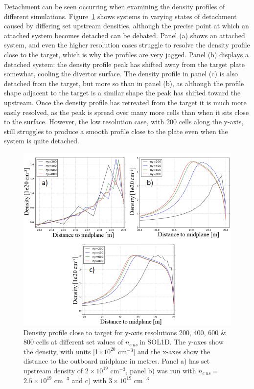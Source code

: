 \documentclass[12pt]{article}  %
\providecommand{\e}[1]{\ensuremath{\times 10^{#1}}} %
\providecommand{\noNe}[1]{{${#1}\times 10^{19}$ cm$^{-3}$}} %
\providecommand{\pow}[1]{{$^{#1}$}} %
\providecommand{\neus}{$n_{e~us}~$} %
\begin{document}
Detachment can be seen occurring when examining the density profiles of different simulations. Figure~\ref{figneprofneusALLtriang} shows systems in varying states of detachment caused by differing set upstream densities, although the precise point at which an attached system becomes detached can be debated. Panel (a) shows an attached system, and even the higher resolution cases struggle to resolve the density profile close to the target, which is why the profiles are very jagged. Panel (b) displays a detached system: the density profile peak has shifted away from the target plate somewhat, cooling the divertor surface. The density profile in panel (c) is also detached from the target, but more so than in panel (b), as although the profile shape adjacent to the target is a similar shape the peak has shifted toward the upstream. Once the density profile has retreated from the target it is much more easily resolved, as the peak is spread over many more cells than when it sits close to the surface. However, the low resolution case, with 200 cells along the y-axis, still struggles to produce a smooth profile close to the plate even when the system is quite detached. 

\begin{figure}
\includegraphics[scale=0.8]{Figures/sol1d/neprofneusALLtrianged.png}
\centering
\caption{Density profile close to target for y-axis resolutions 200, 400, 600 \& 800 cells at different set values of \neus in SOL1D. The y-axes show the density, with units [1\e{20} cm\pow{-3}] and the x-axes show the distance to the outboard midplane in metres. Panel a) has set upstream density of \noNe{2}, panel b) was run with \neus = \noNe{2.5} and c) with \noNe{3}}\label{figneprofneusALLtriang}
\end{figure}
\end{document}
